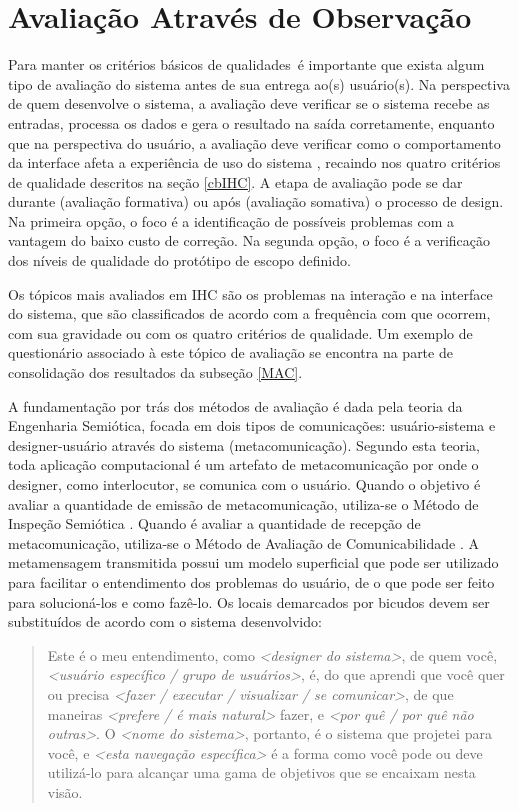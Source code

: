 \section{Avaliação Através de Observação}

\indent Para manter os critérios básicos de qualidades\ é importante que exista algum tipo de avaliação do sistema antes de sua entrega ao(s) usuário(s). Na perspectiva de quem desenvolve o sistema, a avaliação deve verificar se o sistema recebe as entradas, processa os dados e gera o resultado na saída corretamente, enquanto que na perspectiva do usuário, a avaliação deve verificar como o comportamento da interface afeta a experiência de uso do sistema \cite[p. 286]{IHCbook}, recaindo nos quatro critérios de qualidade descritos na seção \ref{cbIHC}. A etapa de avaliação pode se dar durante (avaliação formativa) ou após (avaliação somativa) o processo de design. Na primeira opção, o foco é a identificação de possíveis problemas com a vantagem do baixo custo de correção. Na segunda opção, o foco é a verificação dos níveis de qualidade do protótipo de escopo definido. \cite[p. 294]{IHCbook}

\indent Os tópicos mais avaliados em IHC são os problemas na interação e na interface do sistema, que são classificados de acordo com a frequência com que ocorrem, com sua gravidade ou com os quatro critérios de qualidade. Um exemplo de questionário associado à este tópico de avaliação se encontra na parte de consolidação dos resultados da subseção \ref{MAC}.

\indent A fundamentação por trás dos métodos de avaliação é dada pela teoria da Engenharia Semiótica, focada em dois tipos de comunicações: usuário-sistema e designer-usuário através do sistema (metacomunicação). Segundo esta teoria, toda aplicação computacional é um artefato de metacomunicação por onde o designer, como interlocutor, se comunica com o usuário. Quando o objetivo é avaliar a quantidade de emissão de metacomunicação, utiliza-se o Método de Inspeção Semiótica \cite[p. 330]{IHCbook}. Quando é avaliar a quantidade de recepção de metacomunicação, utiliza-se o Método de Avaliação de Comunicabilidade \cite[p. 344]{IHCbook}. A metamensagem transmitida possui um modelo superficial que pode ser utilizado para facilitar o entendimento dos problemas do usuário, de o que pode ser feito para solucioná-los e como fazê-lo. Os locais demarcados por bicudos devem ser substituídos de acordo com o sistema desenvolvido:

\begin{quote}
Este é o meu entendimento, como \textit{<designer do sistema>}, de quem você, \textit{<usuário específico / grupo de usuários>}, é, do que aprendi que você quer ou precisa \textit{<fazer / executar / visualizar / se comunicar>}, de que maneiras \textit{<prefere / é mais natural>} fazer, e \textit{<por quê / por quê não outras>}. O \textit{<nome do sistema>}, portanto, é o sistema que projetei para você, e \textit{<esta navegação específica>} é a forma como você pode ou deve utilizá-lo para alcançar uma gama de objetivos que se encaixam nesta visão.
\end{quote}

